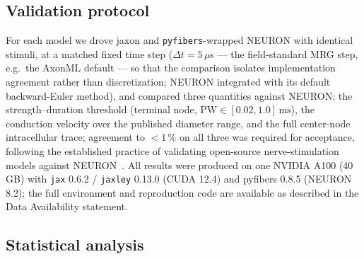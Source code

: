 \subsection{Validation protocol}
\label{sec:methods-validation}

For each model we drove jaxon and \texttt{pyfibers}-wrapped NEURON with
identical stimuli, at a matched fixed time step ($\Delta t = 5\,\mu$s --- the
field-standard MRG step, e.g.\ the AxonML default --- so that the
comparison isolates implementation agreement rather than discretization;
NEURON integrated with its default backward-Euler method), and compared
three quantities against NEURON: the
strength--duration threshold (terminal node, $\mathrm{PW} \in
[0.02,1.0]\,\mathrm{ms}$), the conduction velocity over the published
diameter range, and the full center-node intracellular trace; agreement
to $<\!1\,\%$ on all three was required for acceptance, following the
established practice of validating open-source nerve-stimulation models
against NEURON~\cite{bucksot2021validation}.  All results
were produced on one NVIDIA A100 (40\,GB) with \texttt{jax} 0.6.2 /
\texttt{jaxley} 0.13.0 (CUDA 12.4) and pyfibers 0.8.5 (NEURON 8.2); the
full environment and reproduction code are available as described in
the Data Availability statement.

\subsection{Statistical analysis}
\label{sec:methods-stats}

